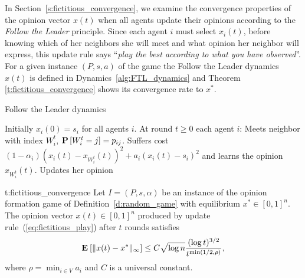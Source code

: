 In Section~\ref{s:fictitious_convergence}, we examine the convergence properties
of the opinion vector $x(t)$ when all agents update their opinions
according to the \emph{Follow the Leader} principle.
Since each agent $i$ must select $x_i(t)$, before knowing which of her neighbors
she will meet and what opinion her neighbor will express, this update rule
says \enquote{\emph{play the best according to what you have observed}}.
For a given instance $(P,s,a)$ of the game %
the Follow the Leader dynamics $x(t)$ is defined in Dynamics~\ref{alg:FTL_dynamics} and
Theorem \ref{t:fictitious_convergence} shows its convergence rate to $x^*$.
%
\begin{algorithm}
  \caption{Follow the Leader dynamics}
  \label{alg:FTL_dynamics}
  \begin{algorithmic}[1]
    \STATE Initially $x_i(0) = s_i$ for all agents $i$.
    \STATE At round $t\geq 0$ each agent $i$:
    \bindent
    \STATE Meets neighbor with index $W_i^t$, $\bm{\mathrm{P}}\left[W_i^t=j\right]=p_{ij}$.
    \STATE Suffers cost \((1-\alpha_i) (x_i(t) - x_{W_i^t}(t))^2 + a_i (x_i(t) - s_i)^2\)
    and learns the opinion $x_{W_i^t}(t)$.
  \STATE Updates her opinion
    \eindent
  \end{algorithmic}
\end{algorithm}
%

%
\begin{reptheorem}{t:fictitious_convergence}
  Let $I = (P,s, \alpha)$ be an instance of the opinion formation
  game of Definition~\ref{d:random_game} with equilibrium
  $x^* \in [0,1]^n$.  The opinion vector $x(t)\in[0,1]^n$ produced by
  update rule~(\ref{eq:fictitious_play}) after $t$ rounds satisfies
  \[
    \bm{\mathrm{E}}_{} \left[ \| x(t) - x^* \|_{\infty} \right] \leq
    C \sqrt{\log n}\frac{(\log t)^{3/2}}{t^{\min(1/2,\rho)}},
  \]
  where $\rho = \min_{i \in V} a_i$ and $C$ is a universal constant.
\end{reptheorem}


